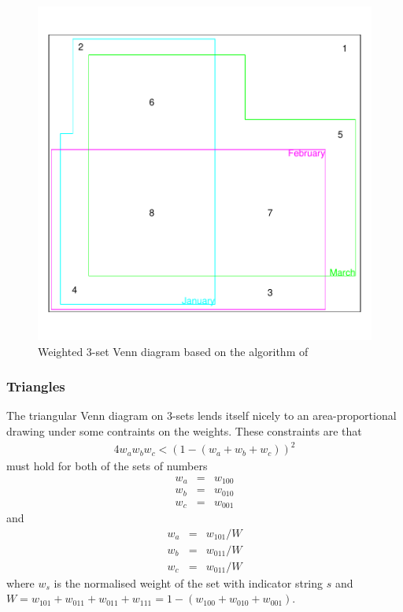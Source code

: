 \documentclass[a4paper]{article}
\begin{document}
\begin{figure}[H]\begin{center}
\includegraphics{Vennfig-S3ccpdemo}
\caption{Weighted 3-set Venn diagram based on the algorithm of \citet{chowruskey:2003}}
\end{center}\end{figure}


\newpage

\subsubsection{Triangles}
The triangular Venn diagram on 3-sets lends itself nicely to
an area-proportional drawing under some contraints on the weights.
These constraints are that
\begin{eqnarray}
4 w_a w_b w_c  < (1 -  (w_a+w_b+w_c))^2
\end{eqnarray}
must hold for both of the sets of numbers
\begin{eqnarray}
w_a &=& w_{100}
\\
w_b &=& w_{010}
\\
w_c &=& w_{001}
\end{eqnarray}
and
\begin{eqnarray}
w_a &=& w_{101}/W
\\
w_b &=& w_{011}/W
\\
w_c &=& w_{011}/W
\end{eqnarray}
where $w_s$ is the normalised weight of the set with indicator string $s$ and
$W=w_{101}+w_{011}+w_{011}+w_{111}=1-(w_{100}+w_{010}+w_{001})$.
\end{document}
